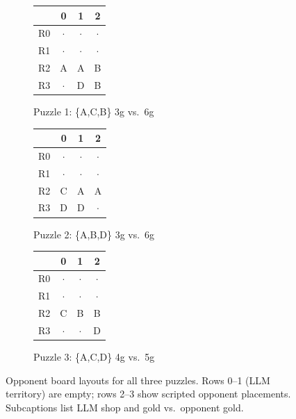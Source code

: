 \documentclass[11pt]{article}
\begin{document}
\begin{figure}[h]
\centering
\begin{subfigure}[t]{0.32\textwidth}
\centering
\begin{tabular}{c|c|c|c}
       & 0 & 1 & 2 \\ \hline
R0 & $\cdot$ & $\cdot$ & $\cdot$ \\ \hline
R1 & $\cdot$ & $\cdot$ & $\cdot$ \\ \hline
R2 & A & A & B \\ \hline
R3 & $\cdot$ & D & B \\
\end{tabular}
\caption{Puzzle 1: \{A,C,B\} 3g vs.\ 6g}
\label{fig:puzzle1}
\end{subfigure}
\hfill
\begin{subfigure}[t]{0.32\textwidth}
\centering
\begin{tabular}{c|c|c|c}
       & 0 & 1 & 2 \\ \hline
R0 & $\cdot$ & $\cdot$ & $\cdot$ \\ \hline
R1 & $\cdot$ & $\cdot$ & $\cdot$ \\ \hline
R2 & C & A & A \\ \hline
R3 & D & D & $\cdot$ \\
\end{tabular}
\caption{Puzzle 2: \{A,B,D\} 3g vs.\ 6g}
\label{fig:puzzle2}
\end{subfigure}
\hfill
\begin{subfigure}[t]{0.32\textwidth}
\centering
\begin{tabular}{c|c|c|c}
       & 0 & 1 & 2 \\ \hline
R0 & $\cdot$ & $\cdot$ & $\cdot$ \\ \hline
R1 & $\cdot$ & $\cdot$ & $\cdot$ \\ \hline
R2 & C & B & B \\ \hline
R3 & $\cdot$ & $\cdot$ & D \\
\end{tabular}
\caption{Puzzle 3: \{A,C,D\} 4g vs.\ 5g}
\label{fig:puzzle3}
\end{subfigure}
\caption{Opponent board layouts for all three puzzles. Rows 0--1 (LLM territory) are empty; rows 2--3 show scripted opponent placements. Subcaptions list LLM shop and gold vs.\ opponent gold.}
\label{fig:puzzles}
\end{figure}

\end{document}
